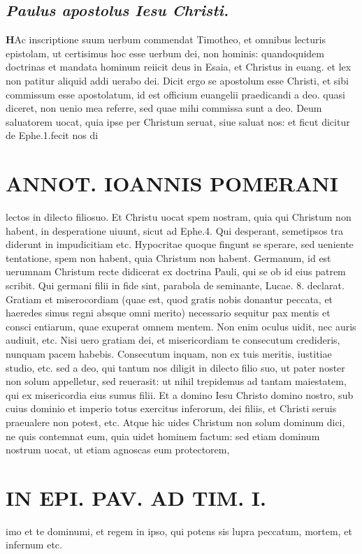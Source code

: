 \documentclass{article}
\begin{document}
\begin{pages}
\subsection*{\textit{Paulus apostolus Iesu Christi. }}\pstart \huge\textbf{H}\normalsize Ac inscriptione suum uerbum commendat Timotheo, et omnibus lecturis epistolam, ut certisimus hoc esse uerbum dei, non hominis: quandoquidem doctrinas et mandata hominum reiicit deus in Esaia, et Christus in euang. et lex non patitur aliquid addi uerabo dei. Dicit ergo se apostolum esse Christi, et sibi commissum esse apostolatum, id est officium euangelii praedicandi a deo. quasi diceret, non uenio mea referre, sed quae mihi commissa sunt a deo.  \pend\pstart Deum saluatorem uocat, quia ipse per Christum seruat, siue saluat nos: et ficut dicitur de Ephe.1.fecit nos di\pend
\section*{ANNOT. IOANNIS POMERANI }\pstart lectos in dilecto filiosuo. Et Christu uocat spem nostram, quia qui Christum non habent, in desperatione uiuunt, sicut ad Ephe.4. Qui desperant, semetipsos tra diderunt in impudicitiam etc. Hypocritae quoque  fingunt se sperare, sed ueniente tentatione, spem non habent, quia Christum non habent. Germanum, id est uerumnam Christum recte didicerat ex doctrina Pauli, qui se ob id eius patrem scribit. Qui germani filii in fide sint, parabola de seminante, Lucae. 8. declarat.  \pend\pstart Gratiam et miserocordiam (quae est, quod gratis nobis donantur peccata, et haeredes simus regni absque  omni merito) necessario sequitur pax mentis et consci entiarum, quae exuperat omnem mentem. Non enim oculus uidit, nec auris audiuit, etc. Nisi uero gratiam dei, et misericordiam te consecutum credideris, nunquam pacem habebis. Consecutum inquam, non ex tuis meritis, iustitiae studio, etc. sed a deo, qui tantum nos diligit in dilecto filio suo, ut pater noster non solum appelletur, sed reuerasit: ut nihil trepidemus ad tantam maiestatem, qui ex misericordia eius sumus filii. Et a domino Iesu Christo domino nostro, sub cuius dominio et imperio totus exercitus inferorum, dei filiis, et Christi seruis praeualere non potest, etc. Atque hic uides Christum non solum dominum dici, ne quis contemnat eum, quia uidet hominem factum: sed etiam dominum nostrum uocat, ut etiam agnoscas eum protectorem,  \pend
\section*{IN EPI. PAV. AD TIM. I. }
\marginpar{[ p.80 ]}\pstart imo et te dominumi, et regem in ipso, qui potens sis lupra peccatum, mortem, et infernum etc.  \pend
{}
{}

\end{pages}
\end{document}
